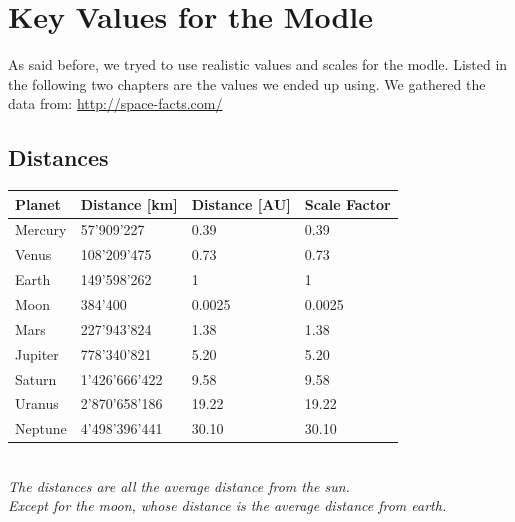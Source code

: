 \pagebreak
\section{Key Values for the Modle}
As said before, we tryed to use realistic values and scales for the modle. Listed in the following two chapters are the values we ended up using. We gathered the data from: \hyperref[space-facts.com]{http://space-facts.com/}

\subsection{Distances}
\begin{center}
    \begin{tabular}{| l | l | l | l |}
    \hline
    Planet & Distance [km] & Distance [AU] & Scale Factor \\ \hline
    Mercury & 57'909'227 & 0.39 & 0.39 \\ \hline
    Venus & 108'209'475 & 0.73 & 0.73 \\ \hline
    Earth & 149'598'262 & 1 & 1 \\ \hline
    Moon & 384'400 & 0.0025 & 0.0025 \\ \hline
    Mars & 227'943'824 & 1.38 & 1.38 \\ \hline
    Jupiter & 778'340'821 & 5.20 & 5.20 \\ \hline
    Saturn & 1'426'666'422 & 9.58 & 9.58 \\ \hline
    Uranus & 2'870'658'186 & 19.22 & 19.22 \\ \hline
    Neptune & 4'498'396'441 & 30.10 & 30.10 \\
    \hline
    \end{tabular}\\
    \textit{The distances are all the average distance from the sun.\\
    Except for the moon, whose distance is the average distance from earth.}
\end{center}


